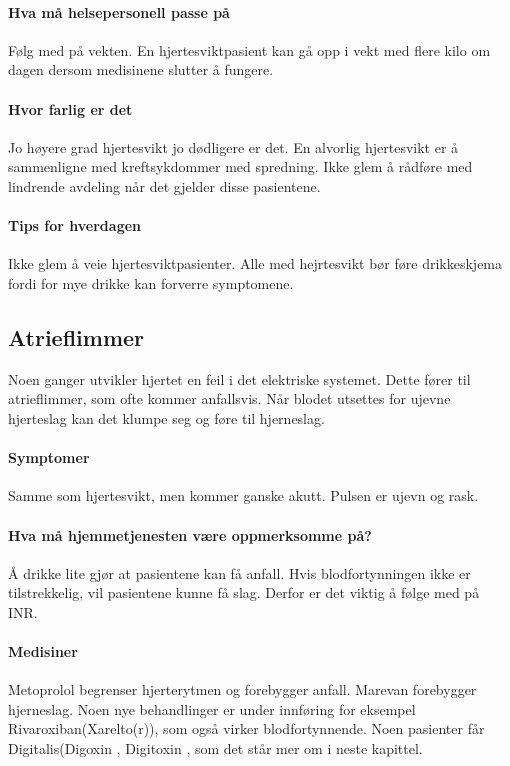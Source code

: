 				\paragraph{Hva må helsepersonell passe på\\}
					Følg med på vekten. En hjertesviktpasient kan gå opp i vekt med flere kilo om dagen dersom medisinene slutter å fungere. 
				\paragraph{Hvor farlig er det\\}
					Jo høyere grad hjertesvikt jo dødligere er det. En alvorlig hjertesvikt er å sammenligne med kreftsykdommer med spredning. Ikke glem å rådføre med lindrende avdeling når det gjelder disse pasientene.
				\paragraph{Tips for hverdagen\\}
					Ikke glem å veie hjertesviktpasienter. Alle med hejrtesvikt bør føre drikkeskjema fordi for mye drikke kan forverre symptomene. 
			\subsection{Atrieflimmer}
				Noen ganger utvikler hjertet en feil i det elektriske systemet. Dette fører til atrieflimmer, som ofte kommer anfallsvis. Når blodet utsettes for ujevne hjerteslag kan det klumpe seg og føre til hjerneslag.
				\paragraph{Symptomer\\}
					Samme som hjertesvikt, men kommer ganske akutt. Pulsen er ujevn og rask. 
				\paragraph{Hva må hjemmetjenesten være oppmerksomme på?\\}
					Å drikke lite gjør at pasientene kan få anfall. Hvis blodfortynningen ikke er tilstrekkelig, vil pasientene kunne få slag. Derfor er det viktig å følge med på INR. 
				\paragraph{Medisiner\\}
					Metoprolol begrenser hjerterytmen og forebygger anfall. Marevan forebygger hjerneslag. Noen nye behandlinger er under innføring for eksempel Rivaroxiban(Xarelto(r)), som også virker blodfortynnende. Noen pasienter får Digitalis(Digoxin \textregistered, Digitoxin \textregistered, som det står mer om i neste kapittel.

